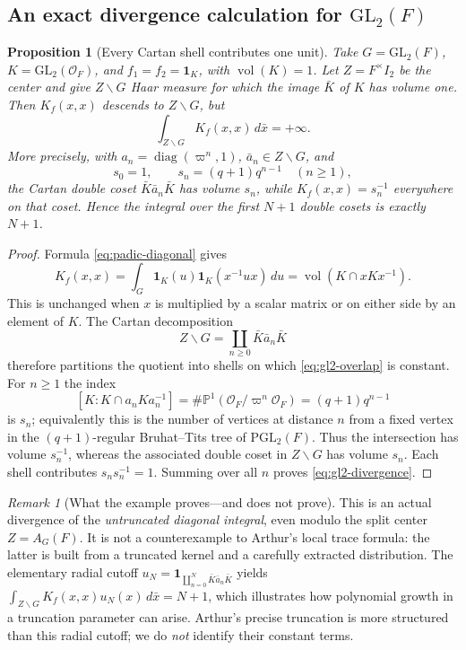 \documentclass[12pt]{article}
\newtheorem{proposition}[theorem]{Proposition}
\theoremstyle{remark}
\newtheorem{remark}[theorem]{Remark}
\begin{document}
\subsection{An exact divergence calculation for $\mathrm{GL}_2(F)$}
\begin{proposition}[Every Cartan shell contributes one unit]
\label{prop:gl2-divergence}
Take $G=\mathrm{GL}_2(F)$,
$K=\mathrm{GL}_2(\mathcal O_F)$, and
$f_1=f_2=\mathbf1_K$, with $\operatorname{vol}(K)=1$.
Let $Z=F^\times I_2$ be the center and give $Z\backslash G$
Haar measure for which the image $\bar K$ of $K$ has volume one.
Then $K_f(x,x)$ descends to $Z\backslash G$, but
\begin{equation}\label{eq:gl2-divergence}
 \int_{Z\backslash G}K_f(x,x)\,d\bar x=+\infty.
\end{equation}
More precisely, with $a_n=\operatorname{diag}(\varpi^n,1)$,
$\bar a_n\in Z\backslash G$, and
\[
 s_0=1,\qquad s_n=(q+1)q^{n-1}\quad(n\geq1),
\]
the Cartan double coset $\bar K\bar a_n\bar K$ has volume $s_n$,
while $K_f(x,x)=s_n^{-1}$ everywhere on that coset. Hence the
integral over the first $N+1$ double cosets is exactly $N+1$.
\end{proposition}
\begin{proof}
Formula \eqref{eq:padic-diagonal} gives
\begin{equation}\label{eq:gl2-overlap}
 K_f(x,x)=\int_G \mathbf1_K(u)\mathbf1_K(x^{-1}ux)\,du
 =\operatorname{vol}(K\cap xKx^{-1}).
\end{equation}
This is unchanged when $x$ is multiplied by a scalar matrix or
on either side by an element of $K$.  The Cartan decomposition
\[
 Z\backslash G=\coprod_{n\geq0}\bar K\bar a_n\bar K
\]
therefore partitions the quotient into shells on which
\eqref{eq:gl2-overlap} is constant.  For $n\geq1$ the index
\[
 [K:K\cap a_nKa_n^{-1}]
  =\#\mathbb P^1(\mathcal O_F/\varpi^n\mathcal O_F)
  =(q+1)q^{n-1}
\]
is $s_n$; equivalently this is the number of vertices at distance
$n$ from a fixed vertex in the $(q+1)$-regular Bruhat--Tits tree of
$\mathrm{PGL}_2(F)$.  Thus the intersection has volume $s_n^{-1}$,
whereas the associated double coset in $Z\backslash G$ has
volume $s_n$.  Each shell contributes $s_n s_n^{-1}=1$.
Summing over all $n$ proves \eqref{eq:gl2-divergence}.
\end{proof}
\begin{remark}[What the example proves---and does not prove]
This is an actual divergence of the \emph{untruncated diagonal
integral}, even modulo the split center $Z=A_G(F)$. It is not a
counterexample to Arthur's local trace formula: the latter is built
from a truncated kernel and a carefully extracted distribution.
The elementary radial cutoff
$u_N=\mathbf1_{\coprod_{n=0}^N\bar K\bar a_n\bar K}$
yields $\int_{Z\backslash G}K_f(x,x)u_N(x)\,d\bar x=N+1$,
which illustrates how polynomial growth in a truncation parameter
can arise.  Arthur's precise truncation is more structured than this
radial cutoff; we do \emph{not} identify their constant terms.
\end{remark}
\end{document}
